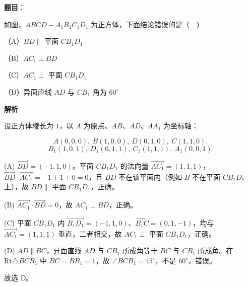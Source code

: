 \begin{answer}

\textbf{题目}：

如图，$ABCD-A_1B_1C_1D_1$ 为正方体，下面结论错误的是（　）
\nopagebreak[4]
\begin{center}\end{center}
\nopagebreak[4]
（A）$BD\parallel$ 平面 $CB_1D_1$

（B）$AC_1\perp BD$

（C）$AC_1\perp$ 平面 $CB_1D_1$

（D）异面直线 $AD$ 与 $CB_1$ 角为 $60^\circ$

\textbf{解析}

设正方体棱长为 $1$，以 $A$ 为原点、$AB$、$AD$、$AA_1$ 为坐标轴：

\nopagebreak[4]
\[A(0,0,0),\ B(1,0,0),\ D(0,1,0),\ C(1,1,0),\]
\nopagebreak[4]
\[B_1(1,0,1),\ D_1(0,1,1),\ C_1(1,1,1),\ A_1(0,0,1).\]

(A) $\overrightarrow{BD}=(-1,1,0)$。平面 $CB_1D_1$ 的法向量 $\overrightarrow{AC_1}=(1,1,1)$，$\overrightarrow{BD}\cdot\overrightarrow{AC_1}=-1+1+0=0$，且 $BD$ 不在该平面内（例如 $B$ 不在平面 $CB_1D_1$ 上），故 $BD\parallel$ 平面 $CB_1D_1$，正确。

(B) $\overrightarrow{AC_1}\cdot\overrightarrow{BD}=0$，故 $AC_1\perp BD$，正确。

(C) 平面 $CB_1D_1$ 内 $\overrightarrow{B_1D_1}=(-1,1,0)$、$\overrightarrow{B_1C}=(0,1,-1)$，均与 $\overrightarrow{AC_1}=(1,1,1)$ 垂直，二者相交，故 $AC_1\perp$ 平面 $CB_1D_1$，正确。

(D) $AD\parallel BC$，异面直线 $AD$ 与 $CB_1$ 所成角等于 $BC$ 与 $CB_1$ 所成角。在 $\mathrm{Rt}\triangle BCB_1$ 中 $BC=BB_1=1$，故 $\angle BCB_1=45^\circ$，不是 $60^\circ$，错误。

故选 D。


\end{answer}
